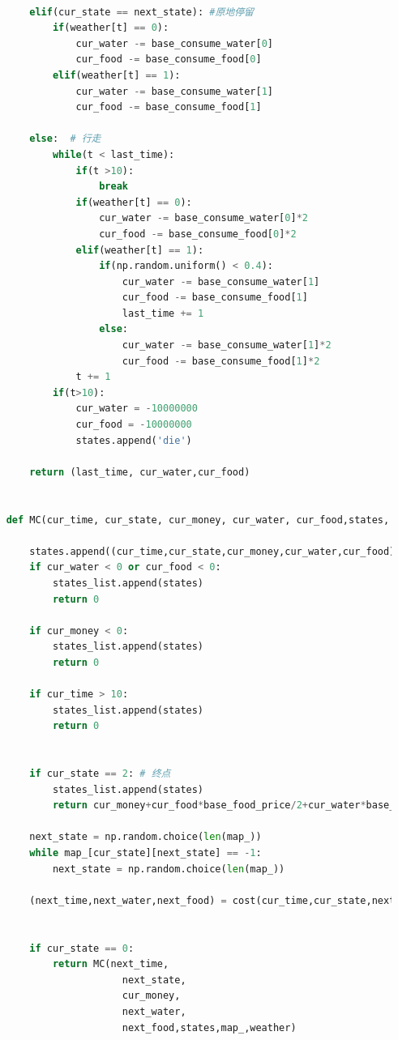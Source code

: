 \documentclass[withoutpreface,bwprint]{cumcmthesis} %
\begin{document}
\begin{appendices}
\begin{lstlisting}[language=python]
    
        elif(cur_state == next_state): #原地停留
            if(weather[t] == 0):
                cur_water -= base_consume_water[0]
                cur_food -= base_consume_food[0]
            elif(weather[t] == 1):
                cur_water -= base_consume_water[1]
                cur_food -= base_consume_food[1]
    
        else:  # 行走
            while(t < last_time):
                if(t >10):
                    break
                if(weather[t] == 0):
                    cur_water -= base_consume_water[0]*2
                    cur_food -= base_consume_food[0]*2
                elif(weather[t] == 1):
                    if(np.random.uniform() < 0.4):
                        cur_water -= base_consume_water[1]
                        cur_food -= base_consume_food[1]
                        last_time += 1
                    else:
                        cur_water -= base_consume_water[1]*2
                        cur_food -= base_consume_food[1]*2
                t += 1
            if(t>10):
                cur_water = -10000000
                cur_food = -10000000
                states.append('die')
                
        return (last_time, cur_water,cur_food)
    
    
    def MC(cur_time, cur_state, cur_money, cur_water, cur_food,states, map_,weather):
    
        states.append((cur_time,cur_state,cur_money,cur_water,cur_food))
        if cur_water < 0 or cur_food < 0:
            states_list.append(states)
            return 0
    
        if cur_money < 0:
            states_list.append(states)
            return 0        
    
        if cur_time > 10:
            states_list.append(states)
            return 0
        
    
        if cur_state == 2: # 终点
            states_list.append(states)
            return cur_money+cur_food*base_food_price/2+cur_water*base_water_price/2
        
        next_state = np.random.choice(len(map_))
        while map_[cur_state][next_state] == -1:
            next_state = np.random.choice(len(map_))
    
        (next_time,next_water,next_food) = cost(cur_time,cur_state,next_state,cur_water,cur_food,states,map_,weather)
    
    
        if cur_state == 0:
            return MC(next_time, 
                        next_state, 
                        cur_money, 
                        next_water, 
                        next_food,states,map_,weather)
                    

\end{lstlisting}
\end{appendices}
\end{document}
